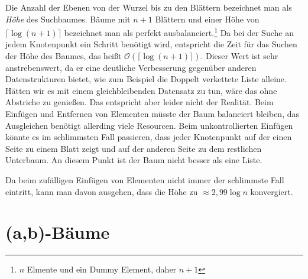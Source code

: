 Die Anzahl der Ebenen von der Wurzel bis zu den Blättern bezeichnet man als \textit{Höhe} des Suchbaumes. Bäume mit $n+1$ Blättern und einer Höhe von $\lceil \log (n+1) \rceil$ bezeichnet man als perfekt ausbalanciert.\footnote{$n$ Elmente und ein Dummy Element, daher $n+1$} Da bei der Suche an jedem Knotenpunkt ein Schritt benötigt wird, entspricht die Zeit für das Suchen der Höhe des Baumes, das heißt $\mathcal{O}(\lceil \log (n+1) \rceil)$.\cite{Sanders:19} Dieser Wert ist sehr anstrebenswert, da er eine deutliche Verbesserung gegenüber anderen Datenstrukturen bietet, wie zum Beispiel die Doppelt verkettete Liste alleine. Hätten wir es mit einem gleichbleibenden Datensatz zu tun, wäre das ohne Abstriche zu genießen. Das entspricht aber leider nicht der Realität. Beim Einfügen und Entfernen von Elementen müsste der Baum balanciert bleiben, das Ausgleichen benötigt allerding viele Resourcen. Beim unkontrollierten Einfügen könnte es im schlimmsten Fall passieren, dass jeder Knotenpunkt auf der einen Seite zu einem Blatt zeigt und auf der anderen Seite zu dem restlichen Unterbaum. An diesem Punkt ist der Baum nicht besser als eine Liste.
\par
Da beim zufälligen Einfügen von Elementen nicht immer der schlimmste Fall eintritt, kann man davon ausgehen, dass die Höhe zu $\approx 2,99 \log n$ konvergiert. \cite{Sanders:19}


\section{(a,b)-Bäume}
\label{section:ab-trees}

